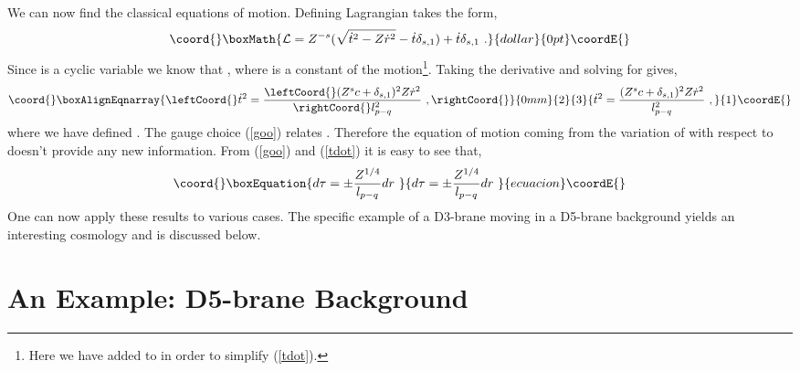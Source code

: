 \documentclass[a4paper,12pt]{article}
\providecommand{\fL}{\mathcal{L}}
\providecommand{\rds}{\dot{r}^2}
\providecommand{\td}{\dot{t}}
\providecommand{\tds}{\dot{t}^2}
\begin{document}
We can now find the classical equations of motion.  Defining
\coordHE{} Lagrangian takes the form, 
$$\coord{}\boxMath{
\fL  = Z^{-s} ( \sqrt{ \tds - Z \rds } - \td \delta_{s,1})+\td \delta_{s,1} \ .
}{dollar}{0pt}\coordE{}$$
Since \coordHE{} is a cyclic variable we know that 
\myHighlight{$\partial \fL / \partial \td = c + \delta_{s,1}$}\coordHE{}, 
where \coordHE{} is a constant of the motion\footnote{Here we have added
\coordHE{} to \coordHE{} in order to simplify (\ref{tdot}).}.  Taking
the derivative and solving for \myHighlight{$\tds$}\coordHE{} gives,
\begin{eqnarray}\coord{}\boxAlignEqnarray{\leftCoord{}
\tds = \frac{\leftCoord{}(Z^{s}c + \delta_{s,1})^2 Z \rds}{\rightCoord{}l_{p-q}^2} \ ,
\label{tdot}
\rightCoord{}}{0mm}{2}{3}{
\tds = \frac{(Z^{s}c + \delta_{s,1})^2 Z \rds}{l_{p-q}^2} \ ,
}{1}\coordE{}\end{eqnarray}
where we have defined \coordHE{}.
The gauge choice (\ref{goo}) relates \coordHE{}.
Therefore the equation of motion coming from the variation of \myHighlight{$\fL$}\coordHE{}
with respect to
\coordHE{} doesn't provide any new information.  From (\ref{goo})
and (\ref{tdot}) it is easy to see that,
\begin{equation}\coord{}\boxEquation{
d \tau = \pm \frac{Z^{1/4}}{l_{p-q}} dr \
\label{dtau}
}{
d \tau = \pm \frac{Z^{1/4}}{l_{p-q}} dr \
}{ecuacion}\coordE{}\end{equation}
One can now apply these results to various cases.  The specific
example of a D3-brane moving in a D5-brane background yields an
interesting cosmology and is discussed below.

%
%
\section{An Example:  D5-brane Background}
%
%
 
\end{document}
